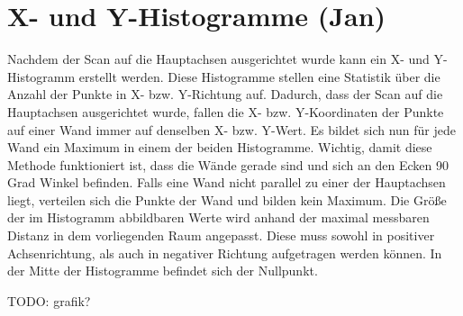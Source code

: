 \section{X- und Y-Histogramme (Jan)}

Nachdem der Scan auf die Hauptachsen ausgerichtet wurde kann ein X- und Y-Histogramm erstellt werden. Diese Histogramme stellen eine Statistik über die Anzahl der Punkte in X- bzw. Y-Richtung auf.
Dadurch, dass der Scan auf die Hauptachsen ausgerichtet wurde, fallen die X- bzw. Y-Koordinaten der Punkte auf einer Wand immer auf denselben X- bzw. Y-Wert. Es bildet sich nun für jede Wand ein Maximum in einem der beiden Histogramme. Wichtig, damit diese Methode funktioniert ist, dass die Wände gerade sind und sich an den Ecken 90 Grad Winkel befinden. Falls eine Wand nicht parallel zu einer der Hauptachsen liegt, verteilen sich die Punkte der Wand und bilden kein Maximum. Die Größe der im Histogramm abbildbaren Werte wird anhand der maximal messbaren Distanz in dem vorliegenden Raum angepasst. Diese muss sowohl in positiver Achsenrichtung, als auch in negativer Richtung aufgetragen werden können. In der Mitte der Histogramme befindet sich der Nullpunkt.

TODO: grafik?